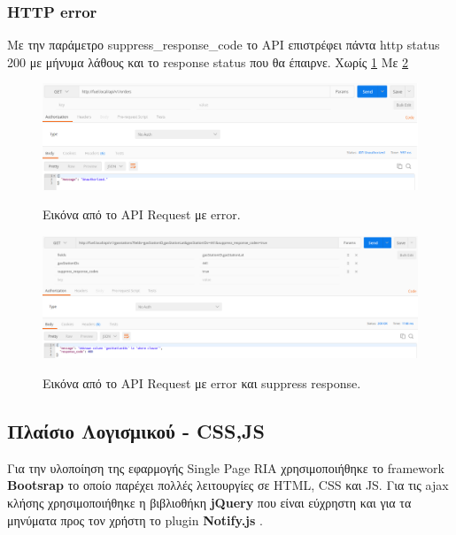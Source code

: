 \subsubsection{HTTP error}
Με την παράμετρο suppress\_response\_code το API επιστρέφει πάντα http status 200 με μήνυμα λάθους και το response status που θα έπαιρνε. Χωρίς \ref{fig:error} Με \ref{fig:suppress}

\begin{figure}[H]
  \caption{Εικόνα από το API Request με error.}
  \centering
    \includegraphics[width=1\textwidth]{img/error.png}
    \label{fig:error}
\end{figure}

\begin{figure}[H]
  \caption{Εικόνα από το API Request με error και suppress response.}
  \centering
    \includegraphics[width=1\textwidth]{img/suppress.png}
    \label{fig:suppress}
\end{figure}

\subsection{Πλαίσιο Λογισμικού - CSS,JS}
Για την υλοποίηση της εφαρμογής Single Page RIA χρησιμοποιήθηκε το framework \textbf{Βootsrap} \cite{bootstrap}
το οποίο παρέχει πολλές λειτουργίες σε HTML, CSS και JS. Για τις ajax κλήσης χρησιμοποιήθηκε η βιβλιοθήκη \textbf{jQuery} \cite{jquery} που είναι εύχρηστη και για τα μηνύματα προς τον χρήστη το plugin \textbf{Notify.js} \cite{notify}.
